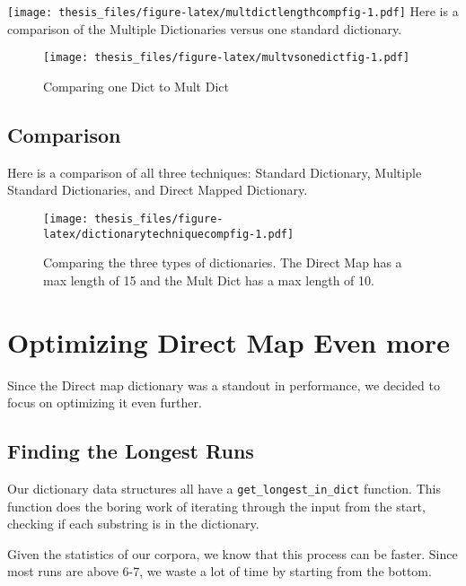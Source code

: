 \documentclass[12pt,twoside]{reedthesis}
\begin{document}
\texttt{[image: thesis\_files/figure-latex/multdictlengthcompfig-1.pdf]}
Here is a comparison of the Multiple Dictionaries versus one standard dictionary.
\begin{figure}
\centering
\texttt{[image: thesis\_files/figure-latex/multvsonedictfig-1.pdf]}
\caption{\label{fig:multvsonedictfig}Comparing one Dict to Mult Dict}
\end{figure}
\hypertarget{comparison}{%
\subsection{Comparison}\label{comparison}}

Here is a comparison of all three techniques: Standard Dictionary, Multiple Standard Dictionaries, and Direct Mapped Dictionary.
\begin{figure}
\centering
\texttt{[image: thesis\_files/figure-latex/dictionarytechniquecompfig-1.pdf]}
\caption{\label{fig:dictionarytechniquecompfig}Comparing the three types of dictionaries. The Direct Map has a max length of 15 and the Mult Dict has a max length of 10.}
\end{figure}
\hypertarget{optimizing-direct-map-even-more}{%
\section{Optimizing Direct Map Even more}\label{optimizing-direct-map-even-more}}

Since the Direct map dictionary was a standout in performance, we decided to focus on optimizing it even further.

\hypertarget{finding-the-longest-runs}{%
\subsection{Finding the Longest Runs}\label{finding-the-longest-runs}}

Our dictionary data structures all have a \texttt{get\_longest\_in\_dict} function. This function does the boring work of iterating through the input from the start, checking if each substring is in the dictionary.

Given the statistics of our corpora, we know that this process can be faster. Since most runs are above 6-7, we waste a lot of time by starting from the bottom.
\end{document}
